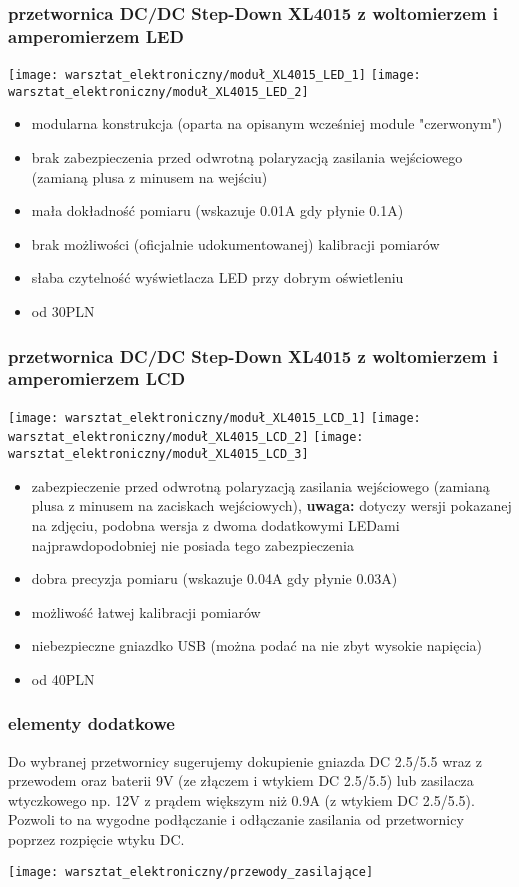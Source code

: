 \documentclass{pdfBooklets}
\newcommand\zaleta{\item[\textbf{\ttfamily +}]}
\newcommand\wada{\item[\textbf{\ttfamily -}]}
\newcommand\info{\item[\textbf{\ttfamily *}]}
\begin{document}
	\subsubsection{przetwornica DC/DC Step-Down XL4015 z woltomierzem i amperomierzem LED}
		\begin{center}
			\texttt{[image: warsztat\_elektroniczny/moduł\_XL4015\_LED\_1]}
			\hspace{0.5cm}
			\texttt{[image: warsztat\_elektroniczny/moduł\_XL4015\_LED\_2]}
		\end{center}
	
		\begin{itemize}
			\zaleta modularna konstrukcja (oparta na opisanym wcześniej module "czerwonym")
			\wada brak zabezpieczenia przed odwrotną polaryzacją zasilania wejściowego (zamianą plusa z minusem na wejściu)
			\wada mała dokładność pomiaru (wskazuje 0.01A gdy płynie 0.1A)
			\wada brak możliwości (oficjalnie udokumentowanej) kalibracji pomiarów
			\wada słaba czytelność wyświetlacza LED przy dobrym oświetleniu
			\info od 30PLN
		\end{itemize}
		
	\subsubsection{przetwornica DC/DC Step-Down XL4015 z woltomierzem i amperomierzem LCD}
		\begin{center}
			\texttt{[image: warsztat\_elektroniczny/moduł\_XL4015\_LCD\_1]}
			\hspace{0.5cm}
			\texttt{[image: warsztat\_elektroniczny/moduł\_XL4015\_LCD\_2]}
			\hspace{0.5cm}
			\texttt{[image: warsztat\_elektroniczny/moduł\_XL4015\_LCD\_3]}
		\end{center}
		\begin{itemize}
			\zaleta  zabezpieczenie przed odwrotną polaryzacją zasilania wejściowego (zamianą plusa z minusem na zaciskach wejściowych),
				\textbf{uwaga:} dotyczy wersji pokazanej na zdjęciu, podobna wersja z dwoma dodatkowymi LEDami najprawdopodobniej nie posiada tego zabezpieczenia
			\zaleta  dobra precyzja pomiaru (wskazuje 0.04A gdy płynie 0.03A)
			\zaleta  możliwość łatwej kalibracji pomiarów
			\wada niebezpieczne gniazdko USB (można podać na nie zbyt wysokie napięcia)
			\info od 40PLN
		\end{itemize}
		
	\subsubsection{elementy dodatkowe}
	Do wybranej przetwornicy sugerujemy dokupienie gniazda DC 2.5/5.5 wraz z przewodem oraz baterii 9V (ze złączem i wtykiem DC 2.5/5.5) lub zasilacza wtyczkowego np. 12V z prądem większym niż 0.9A (z wtykiem DC 2.5/5.5). Pozwoli to na wygodne podłączanie i odłączanie zasilania od przetwornicy poprzez rozpięcie wtyku DC.
	\begin{center}
		\texttt{[image: warsztat\_elektroniczny/przewody\_zasilające]}
	\end{center}
\end{document}
